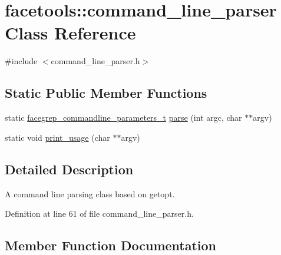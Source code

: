 \hypertarget{classfacetools_1_1command__line__parser}{}\section{facetools\+:\+:command\+\_\+line\+\_\+parser Class Reference}
\label{classfacetools_1_1command__line__parser}


{\ttfamily \#include $<$command\+\_\+line\+\_\+parser.\+h$>$}

\subsection*{Static Public Member Functions}
\begin{DoxyCompactItemize}
\item 
static \hyperlink{structfacetools_1_1facegrep__commandline__parameters__t}{facegrep\+\_\+commandline\+\_\+parameters\+\_\+t} \hyperlink{classfacetools_1_1command__line__parser_ac5d9adc34ac35ad34a4fcb2fe034146c}{parse} (int argc, char $\ast$$\ast$argv)
\item 
static void \hyperlink{classfacetools_1_1command__line__parser_a898ca27fa0e18d903a1a374848030814}{print\+\_\+usage} (char $\ast$$\ast$argv)
\end{DoxyCompactItemize}


\subsection{Detailed Description}
A command line parsing class based on getopt. 

Definition at line 61 of file command\+\_\+line\+\_\+parser.\+h.



\subsection{Member Function Documentation}
